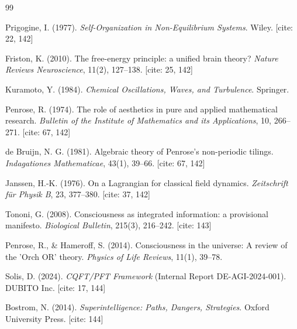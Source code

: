 \documentclass[12pt,a4paper]{article}
\theoremstyle{plain}
\theoremstyle{definition}
\begin{document}
\begin{thebibliography}{99}

Prigogine, I. (1977). \textit{Self-Organization in Non-Equilibrium Systems}. Wiley. [cite: 22, 142]

Friston, K. (2010). The free-energy principle: a unified brain theory? \textit{Nature Reviews Neuroscience}, 11(2), 127--138. [cite: 25, 142]

Kuramoto, Y. (1984). \textit{Chemical Oscillations, Waves, and Turbulence}. Springer. 

Penrose, R. (1974). The role of aesthetics in pure and applied mathematical research. \textit{Bulletin of the Institute of Mathematics and its Applications}, 10, 266--271. [cite: 67, 142]

de Bruijn, N. G. (1981). Algebraic theory of Penrose's non-periodic tilings. \textit{Indagationes Mathematicae}, 43(1), 39--66. [cite: 67, 142]

Janssen, H.-K. (1976). On a Lagrangian for classical field dynamics. \textit{Zeitschrift für Physik B}, 23, 377--380. [cite: 37, 142]

Tononi, G. (2008). Consciousness as integrated information: a provisional manifesto. \textit{Biological Bulletin}, 215(3), 216--242. [cite: 143]

Penrose, R., \& Hameroff, S. (2014). Consciousness in the universe: A review of the 'Orch OR' theory. \textit{Physics of Life Reviews}, 11(1), 39--78. 

Solis, D. (2024). \textit{CQFT/PFT Framework} (Internal Report DE-AGI-2024-001). DUBITO Inc. [cite: 17, 144]

Bostrom, N. (2014). \textit{Superintelligence: Paths, Dangers, Strategies}. Oxford University Press. [cite: 144]

\end{thebibliography}
\end{document}
